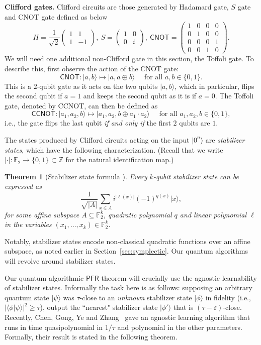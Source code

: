 \documentclass[11pt]{amsart}
\newcommand{\Z}{\mathbb{Z}} %
\newcommand{\F}{\mathbb{F}} %
\newcommand{\bset}[1]{\{0,1\}^{#1}} %
\newcommand{\PFR}{\textsf{PFR}}
\newcommand{\ket}[1]{|#1\rangle}
\theoremstyle{plain}
\newtheorem{theorem}{Theorem}[section]
\theoremstyle{definition}
\theoremstyle{remark}
\begin{document}
\textbf{Clifford gates.} 
Clifford circuits are those generated by Hadamard gate, $S$ gate and \textsf{CNOT} gate defined as below
$$
H=\frac{1}{\sqrt{2}}\begin{pmatrix}
1 & 1\\
1 & -1
\end{pmatrix},\: S=\begin{pmatrix}
1 & 0\\
0 & i
\end{pmatrix},\: \textsf{CNOT}=\begin{pmatrix}
1 & 0 & 0 & 0\\
0 & 1 & 0 & 0\\
0 & 0 & 0 & 1\\
0 & 0 & 1 & 0
\end{pmatrix}.
$$
We will need one additional non-Clifford gate in this section, the Toffoli gate. To describe this, first observe the action of the \textsf{CNOT} gate:
$$
\textsf{CNOT}:\ket{a,b}\mapsto\ket{a,a\oplus b}\quad \text{ for all }a,b\in \{0,1\}.
$$
This is a $2$-qubit gate as it acts on the two qubits $\ket{a,b}$, which in particular, flips the second qubit if $a=1$ and keeps the second qubit as it is if $a=0$. The Toffoli gate, denoted by \textsf{CCNOT}, can then be defined as
$$
\textsf{CCNOT}:\ket{a_1,a_2,b}\mapsto \ket{a_1,a_2,b\oplus a_1\cdot a_2} \quad \text{ for all } a_1,a_2,b\in \{0,1\},
$$
i.e., the gate flips the last qubit \emph{if and only if}  the first $2$ qubits are $1$. 

The states produced by Clifford circuits acting on the input $\ket{0^n}$ are \emph{stabilizer states}, which have the following characterization.
(Recall that we write $|\cdot|: \F_2 \to \bset{} \subset \Z$ for the natural identification map.)

\begin{theorem}[Stabilizer state formula \cite{dehaene2003clifford, nest2008classical}]
\label{thm:neststabilizer}
    Every $k$-qubit stabilizer state can be expressed as
    $$
    \frac{1}{\sqrt{|A|}}\sum_{x\in A}i^{|\ell(x)|}(-1)^{q(x)}\ket{x},
    $$
    for some affine subspace $A\subseteq \F_2^k$, quadratic polynomial $q$ and linear polynomial $\ell$ in the variables $(x_1,\ldots,x_k)\in \F_2^k$. 
\end{theorem}
Notably, stabilizer states encode non-classical quadratic functions over an affine subspace, as noted earlier in Section~\ref{sec:symplectic}. Our quantum algorithms will revolve around stabilizer states.

Our quantum algorithmic $\PFR$ theorem will crucially use the agnostic learnability of stabilizer states. Informally the task here is as follows: supposing an arbitrary quantum state $\ket{\psi}$ was $\tau$-close to an \emph{unknown} stabilizer state $\ket{\phi}$ in fidelity (i.e., $|\langle \phi| \psi \rangle|^2 \geq \tau$), output the ``nearest" stabilizer state $\ket{\phi'}$ that is $(\tau-\varepsilon)$-close. Recently, Chen, Gong, Ye and Zhang~\cite{chen2024stabilizer} gave an agnostic learning algorithm that runs in time quasipolynomial in $1/\tau$ and polynomial in the other parameters. Formally, their result is stated in the following theorem.
\end{document}
